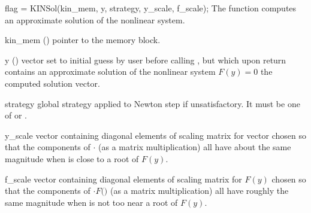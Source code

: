 {
  flag = KINSol(kin\_mem, y, strategy, y\_scale, f\_scale);
}
{
  The function  computes an approximate solution of the nonlinear
  system.
}
{
  \begin{args}[strategy]
  \item[kin\_mem] ()
    pointer to the {\kinsol} memory block.
  \item[y] ()
    vector set to initial guess by user before calling ,
    but which upon return contains an approximate solution of
    the nonlinear system $F(y) = 0$ the computed solution vector.
  \item[strategy]
    global strategy applied to Newton step if unsatisfactory.
    It must be one of  or .
  \item[y\_scale]
    vector containing diagonal elements of scaling matrix for vector 
    chosen so that the components of $\cdot$
    (as a matrix multiplication) all have about the same magnitude when 
     is close to a root of $F(y)$.
  \item[f\_scale]
    vector containing diagonal elements of scaling matrix for $F(y)$ chosen 
    so that the components of $\cdot F($$)$ 
    (as a matrix multiplication) all have roughly the same magnitude when 
     is not too near a root of $F(y)$.
  \end{args}
}
